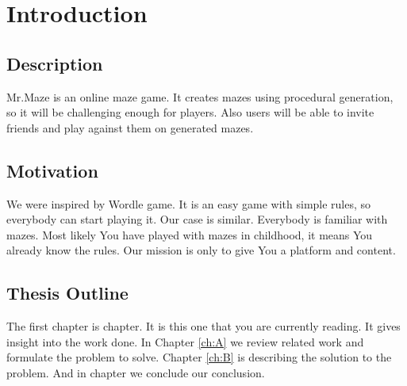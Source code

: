 \chapter{Introduction}\label{ch:intro}
\section{Description}
Mr.Maze is an online maze game. It creates mazes using procedural generation, so it will be challenging enough for players. Also users will be able to invite friends and play against them on generated mazes.
\section{Motivation}
We were inspired by Wordle game. It is an easy game with simple rules, so everybody can start playing it. Our case is similar. Everybody is familiar with mazes. Most likely You have played with mazes in childhood, it means You already know the rules. Our mission is only to give You a platform and content.
\section{Thesis Outline}
The first chapter is  chapter. It is this one that you are currently reading. It gives insight into the work done. In Chapter \ref{ch:A} we review related work and formulate the problem to solve. Chapter \ref{ch:B} is describing the solution to the problem. And in  chapter we conclude our conclusion.